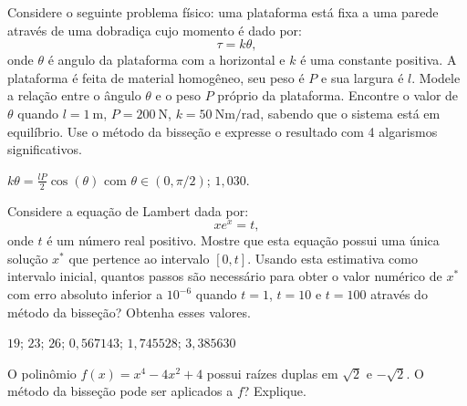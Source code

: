\begin{Exercise}[title=Estática] Considere o seguinte problema físico: uma plataforma está fixa a uma parede através de uma dobradiça cujo momento é dado por:
  \begin{equation*}
    \tau=k\theta,
  \end{equation*}
onde $\theta$ é angulo da plataforma com a horizontal e $k$ é uma constante positiva. A plataforma é feita de material homogêneo, seu peso é $P$ e sua largura é $l$. Modele a relação entre o ângulo $\theta$ e o peso $P$ próprio da plataforma. Encontre o valor de $\theta$ quando $l=1~\mbox{m}$, $P=200~\mbox{N}$, $k=50~\mbox{Nm}/\mbox{rad}$, sabendo que o sistema está em equilíbrio. Use o método da bisseção e expresse o resultado com 4 algarismos significativos.
\end{Exercise}
\begin{Answer}
  \begin{tiny}
    $k\theta=\frac{lP}{2}\cos(\theta)$ com $\theta\in (0, \pi/2)$; $1,030$.
  \end{tiny}
\end{Answer}


\begin{Exercise} Considere a equação de Lambert dada por:
  \begin{equation*}
    xe^x= t,
  \end{equation*}
onde $t$ é um número real positivo. Mostre que esta equação possui uma única solução $x^*$ que pertence ao intervalo $[0, t]$. Usando esta estimativa como intervalo inicial, quantos passos são necessário para obter o valor numérico de $x^*$ com erro absoluto inferior a $10^{-6}$ quando $t=1$, $t=10$ e $t=100$ através do método da bisseção? Obtenha esses valores.
\end{Exercise}
\begin{Answer}
  \begin{tiny}
    $19$; $23$; $26$; $0,567143$; $1,745528$; $3,385630$
  \end{tiny}
\end{Answer}

\begin{Exercise}\label{prob_raiz_dupla} O polinômio $f(x)=x^4-4x^2+4$ possui raízes duplas em $\sqrt{2}$ e $-\sqrt{2}$. O método da bisseção pode ser aplicados a $f$? Explique.
\end{Exercise}

